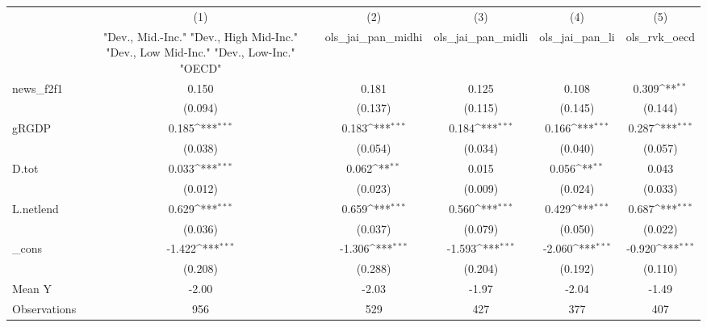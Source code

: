 {
\def\sym#1{\ifmmode^{#1}\else\(^{#1}\)\fi}
\begin{tabular}{l*{5}{c}}
\toprule
            &\multicolumn{1}{c}{(1)}&\multicolumn{1}{c}{(2)}&\multicolumn{1}{c}{(3)}&\multicolumn{1}{c}{(4)}&\multicolumn{1}{c}{(5)}\\
            &\multicolumn{1}{c}{ "Dev., Mid.-Inc." "Dev., High Mid-Inc." "Dev., Low Mid-Inc." "Dev., Low-Inc." "OECD" }&\multicolumn{1}{c}{ols\_jai\_pan\_midhi}&\multicolumn{1}{c}{ols\_jai\_pan\_midli}&\multicolumn{1}{c}{ols\_jai\_pan\_li}&\multicolumn{1}{c}{ols\_rvk\_oecd}\\
\midrule
news\_f2f1   &       0.150         &       0.181         &       0.125         &       0.108         &       0.309\sym{**} \\
            &     (0.094)         &     (0.137)         &     (0.115)         &     (0.145)         &     (0.144)         \\
\addlinespace
gRGDP       &       0.185\sym{***}&       0.183\sym{***}&       0.184\sym{***}&       0.166\sym{***}&       0.287\sym{***}\\
            &     (0.038)         &     (0.054)         &     (0.034)         &     (0.040)         &     (0.057)         \\
\addlinespace
D.tot       &       0.033\sym{***}&       0.062\sym{**} &       0.015         &       0.056\sym{**} &       0.043         \\
            &     (0.012)         &     (0.023)         &     (0.009)         &     (0.024)         &     (0.033)         \\
\addlinespace
L.netlend   &       0.629\sym{***}&       0.659\sym{***}&       0.560\sym{***}&       0.429\sym{***}&       0.687\sym{***}\\
            &     (0.036)         &     (0.037)         &     (0.079)         &     (0.050)         &     (0.022)         \\
\addlinespace
\_cons      &      -1.422\sym{***}&      -1.306\sym{***}&      -1.593\sym{***}&      -2.060\sym{***}&      -0.920\sym{***}\\
            &     (0.208)         &     (0.288)         &     (0.204)         &     (0.192)         &     (0.110)         \\
\midrule
Mean Y      &       -2.00         &       -2.03         &       -1.97         &       -2.04         &       -1.49         \\
Observations&         956         &         529         &         427         &         377         &         407         \\
\bottomrule
\end{tabular}
}
